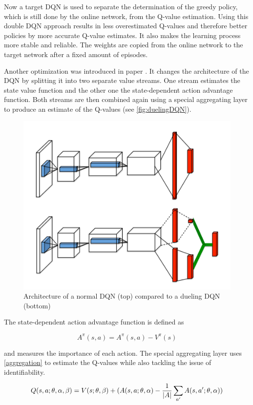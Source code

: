Now a target DQN is used to separate the determination of the greedy policy, which is still done by the online network, from the Q-value estimation. Using this double DQN approach results in less overestimated Q-values and therefore better policies by more accurate Q-value estimates. It also makes the learning process more stable and reliable. The weights are copied from the online network to the target network after a fixed amount of episodes.

Another optimization was introduced in paper \cite{Wang2016}. It changes the architecture of the DQN by splitting it into two separate value streams. One stream estimates the state value function and the other one the state-dependent action advantage function. Both streams are then combined again using a special aggregating layer to produce an estimate of the Q-values (see \autoref{fig:duelingDQN}).  

\begin{figure}[ht]
	\centering
	\includegraphics[width=0.6\linewidth]{figures/duelingDQN.png}
	\caption{Architecture of a normal DQN (top) compared to a dueling DQN (bottom)}
	\label{fig:duelingDQN}
\end{figure}

The state-dependent action advantage function is defined as

\begin{equation} \label{advfunction}
	A^{\pi}(s,a) = A^{\pi}(s,a) - V^{\pi}(s)
\end{equation}

and measures the importance of each action. The special aggregating layer uses \autoref{aggregation} to estimate the Q-values while also tackling the issue of identifiability. 

\begin{equation} \label{aggregation}
	Q(s, a; \theta, \alpha, \beta) = V(s; \theta, \beta) + (A(s, a; \theta, \alpha) - \frac{1}{\lvert A\rvert} \sum_{a'}A(s, a'; \theta, \alpha)) 
\end{equation}


